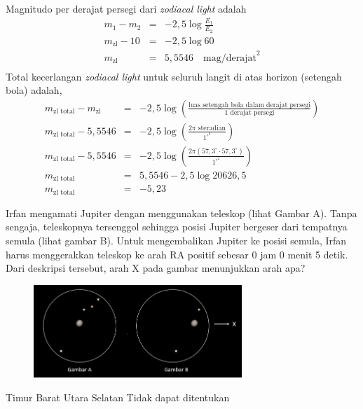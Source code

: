 \documentclass[11pt,fleqn]{exam}
\begin{document}
\begin{questions}
Magnitudo per derajat persegi dari \textit{zodiacal light} adalah 
\begin{eqnarray*}
    m_1 - m_2 &=& -2,5 \log{\frac{E_1}{E_2}}\\
    m_\text{zl} - 10 &=& -2,5 \log{60} \\
    m_\text{zl} &=& 5,5546 \quad \text{mag/derajat}^2\\
\end{eqnarray*}
Total kecerlangan \textit{zodiacal light} untuk seluruh langit di atas horizon (setengah bola) adalah,
\begin{eqnarray*}
    m_\text{zl total} - m_\text{zl} &=& -2,5 \log{\left( \frac{\text{luas setengah bola dalam derajat persegi}}{\text{1 derajat persegi}} \right)}\\
    m_\text{zl total} - 5,5546 &=&  -2,5 \log{\left( \frac{2 \pi \text{  steradian}}{1 ^{\circ^{2}}} \right)}\\
    m_\text{zl total} - 5,5546 &=&  -2,5 \log{\left( \frac{2 \pi (57,3^{\circ} \cdot 57,3^{\circ})}{1 ^{\circ^{2}}} \right)}\\
    m_\text{zl total} &=& 5,5546 -2,5 \log{20626,5} \\
    m_\text{zl total} &=& -5,23
\end{eqnarray*}

\vspace{0.5cm}
\question Irfan mengamati Jupiter dengan menggunakan teleskop (lihat Gambar A). Tanpa sengaja, teleskopnya tersenggol sehingga posisi Jupiter bergeser dari tempatnya semula (lihat gambar B). Untuk mengembalikan Jupiter ke posisi semula, Irfan harus menggerakkan teleskop ke arah RA positif sebesar 0 jam 0 menit 5 detik. Dari deskripsi tersebut, arah X pada gambar menunjukkan arah apa?
\begin{figure}[H]
\centering
\includegraphics[width=0.7\textwidth]{osp2022_13.png}
\label{fig:osp2022_13}
\end{figure}
\begin{choices}
\choice Timur
\choice Barat
\choice Utara
\choice Selatan
\choice Tidak dapat ditentukan
\end{choices}


\end{questions}
\end{document}
